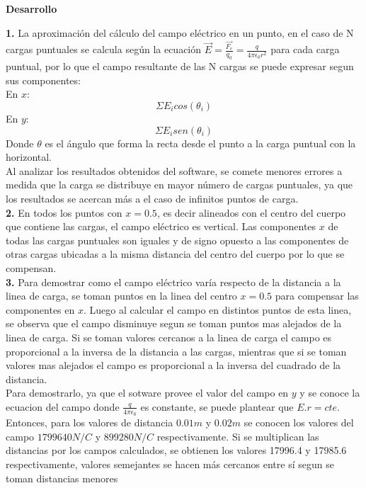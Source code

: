 \documentclass[11pt, letterpaper]{article}
\begin{document}
\pagebreak
\begin{center}\textbf{Desarrollo}\end{center}
    \textbf{1.} La aproximación del cálculo del campo eléctrico en un punto, en el 
    caso de N cargas puntuales se calcula según la ecuación 
    $\vec{E} = \frac{\vec{F_e}}{q_0} = \frac{q}{4 \pi \epsilon_0 r^2}$
    para cada carga puntual, por lo que el campo resultante de las N
    cargas se puede expresar segun sus componentes:\\
    En $x$: $$ \Sigma  E_i cos(\theta_i) $$
    En $y$: $$ \Sigma  E_i sen(\theta_i) $$
    Donde $\theta$ es el ángulo que forma la recta desde el punto a la carga 
    puntual con la horizontal.\\
    Al analizar los resultados obtenidos del software, se comete menores errores
    a medida que la carga se distribuye en mayor número de cargas puntuales, ya
    que los resultados se acercan más a el caso de infinitos puntos de carga.\\
    \textbf{2.} En todos los puntos con $x=0.5$, es decir alineados con el centro del
    cuerpo que contiene las cargas, el campo eléctrico es vertical. Las componentes
    $x$ de todas las cargas puntuales son iguales y de signo opuesto a las 
    componentes de otras cargas ubicadas a la misma distancia del centro del
    cuerpo por lo que se compensan.\\
    \textbf{3.} Para demostrar como el campo eléctrico varía respecto de la distancia a
    la linea de carga, se toman puntos en la linea del centro $x=0.5$ para 
    compensar las componentes en $x$. Luego al calcular el campo en distintos
    puntos de esta linea, se observa que el campo disminuye segun se toman puntos
    mas alejados de la linea de carga. Si se toman valores cercanos a la linea
    de carga el campo es proporcional a la inversa de la distancia a las cargas,
    mientras que si se toman valores mas alejados el campo es proporcional a la 
    inversa del cuadrado de la distancia.\\
    Para demostrarlo, ya que el sotware provee el valor del campo en $y$ y se 
    conoce la ecuacion del campo donde $\frac{q}{4\pi \epsilon_0}$ es constante,
    se puede plantear que $E.r=cte$. Entonces, para los valores de distancia
    $0.01m$ y $0.02m$ se conocen los valores del campo $1799640 N/C$ y $899280 N/C$
    respectivamente. Si se multiplican las distancias por los campos calculados,
    se obtienen los valores 17996.4 y 17985.6 respectivamente, valores 
    semejantes se hacen más cercanos entre sí segun se toman distancias menores
\end{document}
